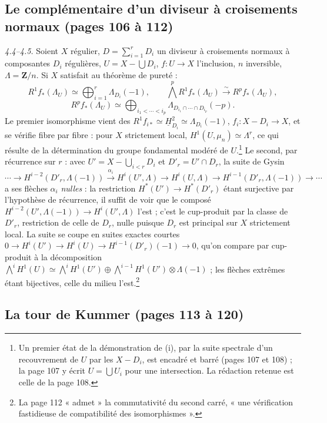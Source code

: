 \documentclass[11pt,a4paper]{article}
\begin{document}
\subsection*{Le complémentaire d'un diviseur à croisements normaux (pages 106 à 112)}

\emph{4.4--4.5.} Soient $X$ régulier, $D = \sum_{i=1}^r D_i$ un diviseur à
croisements normaux à composantes $D_i$ régulières, $U = X - \bigcup D_i$,
$f : U \to X$ l'inclusion, $n$ inversible, $\Lambda = \mathbf{Z}/n$. Si $X$
satisfait au théorème de pureté :
\[
  R^1 f_*(\Lambda_U) \simeq \bigoplus_{i=1}^r \Lambda_{D_i}(-1), \qquad
  \textstyle\bigwedge^p R^1 f_*(\Lambda_U) \xrightarrow{\ \sim\ } R^p f_*(\Lambda_U),
\]
\[
  R^p f_*(\Lambda_U) \simeq \bigoplus_{i_1 < \cdots < i_p}
  \Lambda_{D_{i_1} \cap \cdots \cap D_{i_p}}(-p) .
\]
Le premier isomorphisme vient des $R^1 f_{i*} \simeq \underline H^2_{D_i}
\simeq \Lambda_{D_i}(-1)$, $f_i : X - D_i \to X$, et se vérifie fibre par fibre :
pour $X$ strictement local, $H^1(U, \mu_n) \simeq \Lambda^r$, ce qui résulte de
la détermination du groupe fondamental modéré de $U$.\footnote{Un premier état
de la démonstration de (i), par la suite spectrale d'un recouvrement de $U$ par
les $X - D_i$, est encadré et barré (pages 107 et 108) ; la page 107 y écrit
$U = \bigcup U_i$ pour une intersection. La rédaction retenue est celle de la
page 108.} Le second, par récurrence sur $r$ : avec $U' = X - \bigcup_{i < r}
D_i$ et $D'_r = U' \cap D_r$, la suite de Gysin
\[
  \cdots \to H^{i-2}(D'_r, \Lambda(-1)) \xrightarrow{\ \alpha_i\ } H^i(U', \Lambda)
  \to H^i(U, \Lambda) \to H^{i-1}(D'_r, \Lambda(-1)) \to \cdots
\]
a ses flèches $\alpha_i$ \emph{nulles} : la restriction $H^*(U') \to H^*(D'_r)$
étant surjective par l'hypothèse de récurrence, il suffit de voir que le composé
$H^{i-2}(U', \Lambda(-1)) \to H^i(U', \Lambda)$ l'est ; c'est le cup-produit par
la classe de $D'_r$, restriction de celle de $D_r$, nulle puisque $D_r$ est
principal sur $X$ strictement local. La suite se coupe en suites exactes courtes
$0 \to H^i(U') \to H^i(U) \to H^{i-1}(D'_r)(-1) \to 0$, qu'on compare par
cup-produit à la décomposition $\bigwedge^i H^1(U) \simeq \bigwedge^i H^1(U')
\oplus \bigwedge^{i-1}H^1(U') \otimes \Lambda(-1)$ ; les flèches extrêmes étant
bijectives, celle du milieu l'est.\footnote{La page 112 « admet » la
commutativité du second carré, « une vérification fastidieuse de compatibilité
des isomorphismes ».}

\subsection*{La tour de Kummer (pages 113 à 120)}
\end{document}
